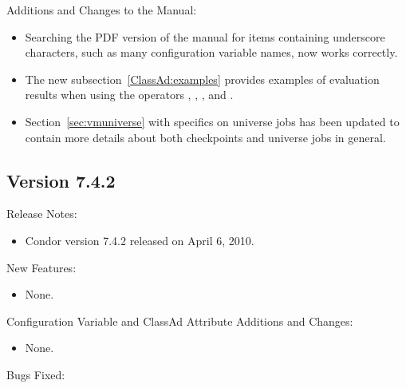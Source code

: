 \noindent Additions and Changes to the Manual:

\begin{itemize}

\item Searching the PDF version of the manual for items containing 
underscore characters, such as many configuration variable names,
now works correctly.

\item The new subsection~\ref{ClassAd:examples} provides examples of
evaluation results when using the operators \Expr{==}, ,
\Expr{!=}, and \Expr{=!=}.

\item Section~\ref{sec:vmuniverse} with specifics on 
universe jobs has been updated to contain more details about
both checkpoints and  universe jobs in general.

\end{itemize}


\subsection*{\label{sec:New-7-4-2}Version 7.4.2}

\noindent Release Notes:

\begin{itemize}

\item Condor version 7.4.2 released on April 6, 2010.

\end{itemize}


\noindent New Features:

\begin{itemize}

\item None.

\end{itemize}

\noindent Configuration Variable and ClassAd Attribute Additions and Changes:

\begin{itemize}

\item None.

\end{itemize}

\noindent Bugs Fixed:

